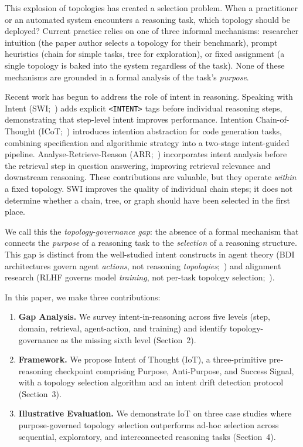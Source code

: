 \documentclass[11pt,a4paper]{article}
\begin{document}
This explosion of topologies has created a selection problem. When a practitioner or an automated system encounters a reasoning task, which topology should be deployed? Current practice relies on one of three informal mechanisms: researcher intuition (the paper author selects a topology for their benchmark), prompt heuristics (chain for simple tasks, tree for exploration), or fixed assignment (a single topology is baked into the system regardless of the task). None of these mechanisms are grounded in a formal analysis of the task's \emph{purpose}.

Recent work has begun to address the role of intent in reasoning. Speaking with Intent (SWI;~\citealt{yin2025swi}) adds explicit \texttt{<INTENT>} tags before individual reasoning steps, demonstrating that step-level intent improves performance. Intention Chain-of-Thought (ICoT;~\citealt{li2025icot}) introduces intention abstraction for code generation tasks, combining specification and algorithmic strategy into a two-stage intent-guided pipeline. Analyse-Retrieve-Reason (ARR;~\citealt{yin2025arr}) incorporates intent analysis before the retrieval step in question answering, improving retrieval relevance and downstream reasoning. These contributions are valuable, but they operate \emph{within} a fixed topology. SWI improves the quality of individual chain steps; it does not determine whether a chain, tree, or graph should have been selected in the first place.

We call this the \emph{topology-governance gap}: the absence of a formal mechanism that connects the \emph{purpose} of a reasoning task to the \emph{selection} of a reasoning structure. This gap is distinct from the well-studied intent constructs in agent theory (BDI architectures govern agent \emph{actions}, not reasoning \emph{topologies};~\citealt{cohen1990intention,rao1995bdi}) and alignment research (RLHF governs model \emph{training}, not per-task topology selection;~\citealt{ouyang2022instructgpt}).

In this paper, we make three contributions:

\begin{enumerate}
  \item \textbf{Gap Analysis.} We survey intent-in-reasoning across five levels (step, domain, retrieval, agent-action, and training) and identify topology-governance as the missing sixth level (Section~2).
  \item \textbf{Framework.} We propose Intent of Thought (IoT), a three-primitive pre-reasoning checkpoint comprising Purpose, Anti-Purpose, and Success Signal, with a topology selection algorithm and an intent drift detection protocol (Section~3).
  \item \textbf{Illustrative Evaluation.} We demonstrate IoT on three case studies where purpose-governed topology selection outperforms ad-hoc selection across sequential, exploratory, and interconnected reasoning tasks (Section~4).
\end{enumerate}
\end{document}
